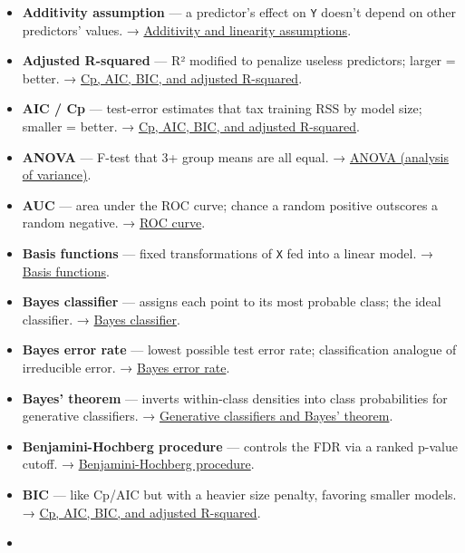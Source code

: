 \documentclass[
  10pt,
  letterpaper,
  onecolumn]{article}
\providecommand{\tightlist}{%
  \setlength{\itemsep}{0pt}\setlength{\parskip}{0pt}}
\begin{document}
\begin{itemize}
\tightlist
\item
  \textbf{Additivity assumption} --- a predictor's effect on \texttt{Y}
  doesn't depend on other predictors' values. →
  \protect\hyperlink{additivity-and-linearity-assumptions}{Additivity
  and linearity assumptions}.
\item
  \textbf{Adjusted R-squared} --- R² modified to penalize useless
  predictors; larger = better. →
  \protect\hyperlink{cp-aic-bic-and-adjusted-r-squared}{Cp, AIC, BIC,
  and adjusted R-squared}.
\item
  \textbf{AIC / Cp} --- test-error estimates that tax training RSS by
  model size; smaller = better. →
  \protect\hyperlink{cp-aic-bic-and-adjusted-r-squared}{Cp, AIC, BIC,
  and adjusted R-squared}.
\item
  \textbf{ANOVA} --- F-test that 3+ group means are all equal. →
  \protect\hyperlink{anova-analysis-of-variance}{ANOVA (analysis of
  variance)}.
\item
  \textbf{AUC} --- area under the ROC curve; chance a random positive
  outscores a random negative. → \protect\hyperlink{roc-curve}{ROC
  curve}.
\item
  \textbf{Basis functions} --- fixed transformations of \texttt{X} fed
  into a linear model. → \protect\hyperlink{basis-functions}{Basis
  functions}.
\item
  \textbf{Bayes classifier} --- assigns each point to its most probable
  class; the ideal classifier. →
  \protect\hyperlink{bayes-classifier}{Bayes classifier}.
\item
  \textbf{Bayes error rate} --- lowest possible test error rate;
  classification analogue of irreducible error. →
  \protect\hyperlink{bayes-error-rate}{Bayes error rate}.
\item
  \textbf{Bayes' theorem} --- inverts within-class densities into class
  probabilities for generative classifiers. →
  \protect\hyperlink{generative-classifiers-and-bayes-theorem}{Generative
  classifiers and Bayes' theorem}.
\item
  \textbf{Benjamini-Hochberg procedure} --- controls the FDR via a
  ranked p-value cutoff. →
  \protect\hyperlink{benjamini-hochberg-procedure}{Benjamini-Hochberg
  procedure}.
\item
  \textbf{BIC} --- like Cp/AIC but with a heavier size penalty, favoring
  smaller models. →
  \protect\hyperlink{cp-aic-bic-and-adjusted-r-squared}{Cp, AIC, BIC,
  and adjusted R-squared}.
\item

\end{itemize}
\end{document}
